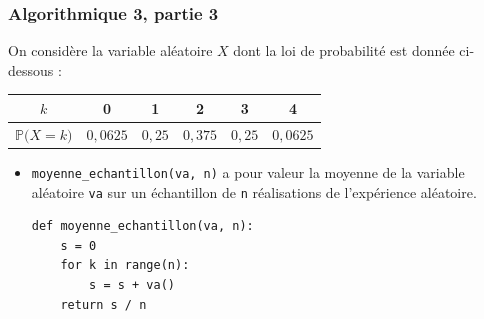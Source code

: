 \documentclass[11pt, hyperref={urlcolor=red,%
            linkcolor=blue, %
            colorlinks=true}]{beamer}
\newcommand{\proba}[1]{\mathbb{P}\big(#1\big)}
\begin{document}
\begin{frame}[fragile]
\frametitle{Algorithmique 3,  partie 3}

On considère la variable aléatoire $X$ dont la loi de probabilité est donnée ci-dessous :
	
	\begin{center}
\begin{tabular}{|c|c|c|c|c|c|}
\hline 
$k$ & 0 & 1 & 2 & 3 & 4 \\ 
\hline 
$\proba{X=k}$ & $0,0625$ & $0,25$ & $0,375$ & $0,25$ & $0,0625$ \\ 
\hline 
\end{tabular} 
	\end{center}
	
\begin{itemize} 

\pause \item \texttt{moyenne\_echantillon(va, n)} a pour valeur la moyenne de la variable aléatoire \texttt{va} sur un échantillon de \texttt{n} réalisations de l'expérience aléatoire.
	

\begin{lstlisting}[style=rond]
def moyenne_echantillon(va, n):
    s = 0
    for k in range(n):
        s = s + va() 
    return s / n
\end{lstlisting}

\end{itemize}


\end{frame}
\end{document}
